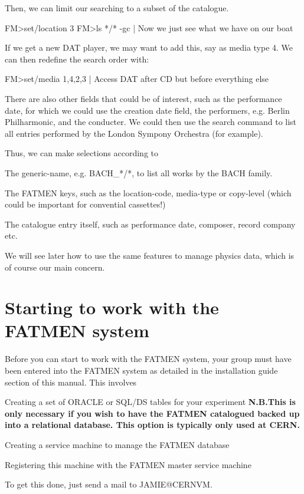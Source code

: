 \par
Then, we can limit our searching to a subset of the catalogue.
\begin{XMP}
FM>set/location 3
FM>ls */* -gc | Now we just see what we have on our boat
\end{XMP}
\par
If we get a new DAT player, we may want to add this,
say as media type 4. We can then redefine the search
order with:
\begin{XMP}
FM>set/media 1,4,2,3 | Access DAT after CD but before everything else
\end{XMP}
\par
There are also other fields that could be of interest,
such as the performance date, for which we could use
the creation date field, the performers, e.g.
Berlin Philharmonic, and the conducter. 
We could then use the search command to list all entries
performed by the London Sympony Orchestra (for example).
\par
Thus, we can make selections according to 
\begin{UL}
\item
The generic-name, e.g. BACH\_*/*, to list all works
by the BACH family.
\item
The FATMEN keys, such as the location-code, media-type
or copy-level (which could be important for convential
cassettes!)
\item
The catalogue entry itself, such as performance date,
composer, record company etc.
\end{UL}
\par
We will see later how to use the same features to 
manage physics data, which is of course our main concern.
\section{Starting to work with the FATMEN system}
\par
Before you can start to work with the FATMEN system, your group must
have been entered into the FATMEN system as detailed in the installation
guide section of this manual. This involves
\begin{UL}
\item
Creating a set of ORACLE or SQL/DS tables for your experiment
{\bf N.B.This is only necessary if you wish to have the
FATMEN catalogued backed up into a relational database.
This option is typically only used at CERN.}
\item
Creating a service machine to manage the FATMEN database
\item
Registering this machine with the FATMEN master service machine
\end{UL}
\par
To get this done, just send a mail to JAMIE@CERNVM.
